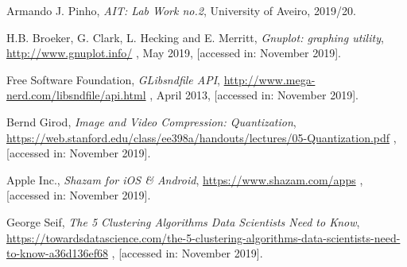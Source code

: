 \documentclass[12pt]{article}
\begin{document}
\begin{thebibliography}{9}
  

    Armando J. Pinho,
    \textit{AIT: Lab Work no.2},
    University of Aveiro,
    2019/20.
  
    H.B. Broeker, G. Clark, L. Hecking and E. Merritt,
    \textit{Gnuplot: graphing utility},
    \url{http://www.gnuplot.info/} ,
    May 2019,
    [accessed in: November 2019].

    Free Software Foundation,
    \textit{GLibsndfile API},
    \url{http://www.mega-nerd.com/libsndfile/api.html} ,
    April 2013,
    [accessed in: November 2019].

    Bernd Girod,
    \textit{Image and Video Compression: Quantization},
    \url{https://web.stanford.edu/class/ee398a/handouts/lectures/05-Quantization.pdf} ,
    [accessed in: November 2019].

    Apple Inc.,
    \textit{Shazam for iOS \& Android},
    \url{https://www.shazam.com/apps} ,
    [accessed in: November 2019].

    George Seif,
    \textit{The 5 Clustering Algorithms Data Scientists Need to Know},
    \url{https://towardsdatascience.com/the-5-clustering-algorithms-data-scientists-need-to-know-a36d136ef68} ,
    [accessed in: November 2019].

\end{thebibliography}

\clearpage
\end{document}
